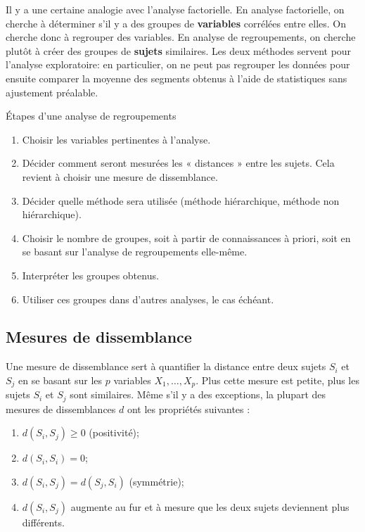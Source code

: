 \documentclass[
  11pt,
  letterpaper,
]{book}
\providecommand{\tightlist}{%
  \setlength{\itemsep}{0pt}\setlength{\parskip}{0pt}}
\theoremstyle{definition}
\theoremstyle{definition}
\theoremstyle{definition}
\theoremstyle{definition}
\theoremstyle{remark}
\begin{document}
Il y a une certaine analogie avec l'analyse factorielle. En analyse factorielle, on cherche à déterminer s'il y a des groupes de \textbf{variables} corrélées entre elles. On cherche donc à regrouper des variables. En analyse de regroupements, on cherche plutôt à créer des groupes de \textbf{sujets} similaires. Les deux méthodes servent pour l'analyse exploratoire: en particulier, on ne peut pas regrouper les données pour ensuite comparer la moyenne des segments obtenus à l'aide de statistiques sans ajustement préalable.

Étapes d'une analyse de regroupements

\begin{enumerate}
\def\labelenumi{\arabic{enumi})}
\tightlist
\item
  Choisir les variables pertinentes à l'analyse.
\item
  Décider comment seront mesurées les « distances » entre les sujets. Cela revient à choisir une mesure de dissemblance.
\item
  Décider quelle méthode sera utilisée (méthode hiérarchique, méthode non hiérarchique).
\item
  Choisir le nombre de groupes, soit à partir de connaissances à priori, soit en se basant sur l'analyse de regroupements elle-même.
\item
  Interpréter les groupes obtenus.
\item
  Utiliser ces groupes dans d'autres analyses, le cas échéant.
\end{enumerate}

\hypertarget{mesures-de-dissemblance}{%
\subsection{Mesures de dissemblance}\label{mesures-de-dissemblance}}

Une mesure de dissemblance sert à quantifier la distance entre deux sujets \(S_i\) et \(S_j\) en se basant sur les \(p\) variables \(X_1, \ldots, X_p\). Plus cette mesure est petite, plus les sujets \(S_i\) et \(S_j\) sont similaires. Même s'il y a des exceptions, la plupart des mesures de dissemblances \(d\) ont les propriétés suivantes :

\begin{enumerate}
\def\labelenumi{\arabic{enumi})}
\tightlist
\item
  \(d(S_i, S_j) \geq 0\) (positivité);
\item
  \(d(S_i, S_i)=0\);
\item
  \(d(S_i, S_j)=d(S_j, S_i)\) (symmétrie);
\item
  \(d(S_i, S_j)\) augmente au fur et à mesure que les deux sujets deviennent plus différents.
\end{enumerate}
\end{document}
